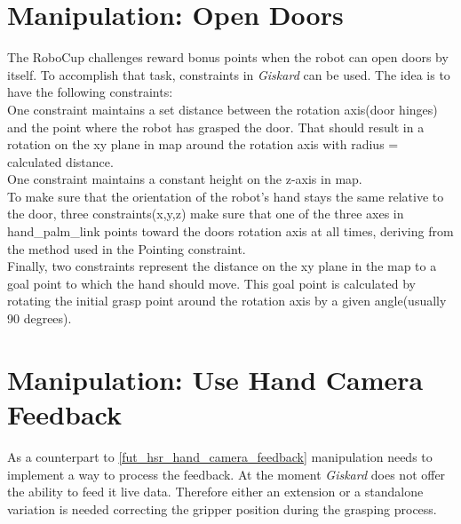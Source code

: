 \documentclass[main.tex]{subfiles}
\begin{document}
		\section{Manipulation: Open Doors}
		The RoboCup challenges reward bonus points when the robot can open doors by itself. To accomplish that task, constraints in \textit{Giskard} can be used. The idea is to have the following constraints:\\
		One constraint maintains a set distance between the rotation axis(door hinges) and the point where the robot has grasped the door. That should result in a rotation on the xy plane in map around the rotation axis with radius = calculated distance.\\
		One constraint maintains a constant height on the z-axis in map.\\
		To make sure that the orientation of the robot's hand stays the same relative to the door, three constraints(x,y,z) make sure that one of the three axes in hand\_palm\_link points toward the doors rotation axis at all times, deriving from the method used in the Pointing constraint.\\
		Finally, two constraints represent the distance on the xy plane in the map to a goal point to which the hand should move. This goal point is calculated by rotating the initial grasp point around the rotation axis by a given angle(usually 90 degrees).
		
		\section{Manipulation: Use Hand Camera Feedback}
		As a counterpart to \ref{fut_hsr_hand_camera_feedback} manipulation needs to implement a way to process the feedback. At the moment \textit{Giskard} does not offer the ability to feed it live data. Therefore either an extension or a standalone variation is needed correcting the gripper position during the grasping process.
				
		
		
	\endgroup
\end{document}
